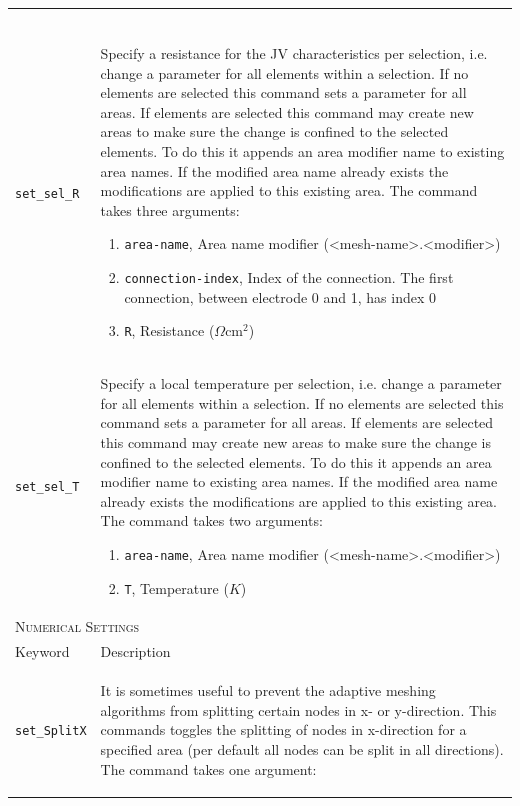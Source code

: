 \documentclass[noshowpacs,preprintnumbers,amsmath,amssymb, letter]{revtex4}
\begin{document}
\begin{longtable}{p{}p{}}
\begin{enumerate}
\end{enumerate}\\
\texttt{set\_sel\_R}	&  Specify a resistance for the JV characteristics per selection, i.e. change a parameter for all elements within a selection. If no elements are selected this command sets a parameter for all areas. If elements are selected this command may create new areas to make sure the change is confined to the selected elements. To do this it appends an area modifier name to existing area names. If the modified area name already exists the modifications are applied to this existing area. The command takes three arguments:
\begin{enumerate}
\item \texttt{area-name}, Area name modifier (\textless mesh-name\textgreater .\textless modifier\textgreater )
\item \texttt{connection-index}, Index of the connection. The first connection, between electrode 0 and 1,  has index 0
\item \texttt{R}, Resistance ($\Omega \text{cm}^2$)
\end{enumerate}\\
\texttt{set\_sel\_T}	&  Specify a local temperature per selection, i.e. change a parameter for all elements within a selection. If no elements are selected this command sets a parameter for all areas. If elements are selected this command may create new areas to make sure the change is confined to the selected elements. To do this it appends an area modifier name to existing area names. If the modified area name already exists the modifications are applied to this existing area. The command takes two arguments:
\begin{enumerate}
\item \texttt{area-name}, Area name modifier (\textless mesh-name\textgreater .\textless modifier\textgreater )
\item \texttt{T}, Temperature ($K$)
\end{enumerate}\\
\multicolumn{2}{l}{\textsc{Numerical Settings}} \\*
\hline
Keyword & Description \\
\texttt{set\_SplitX}	&  It is sometimes useful to prevent the adaptive meshing algorithms from splitting certain nodes in x- or y-direction. This commands toggles the splitting of nodes in x-direction for a specified area (per default all nodes can be split in all directions). The command takes one argument:
\begin{enumerate}

\end{enumerate}
\end{longtable}
\end{document}
